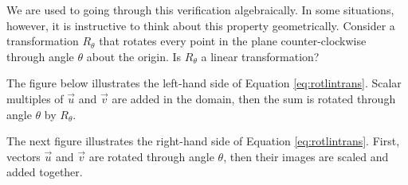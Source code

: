 \documentclass{ximera}
\begin{document}
We are used to going through this verification algebraically.  In some situations, however, it is instructive to think about this property geometrically.  Consider a transformation $R_{\theta}$ that rotates every point in the plane counter-clockwise through angle $\theta$ about the origin.  Is $R_{\theta}$ a linear transformation?

The figure below illustrates the left-hand side of Equation \ref{eq:rotlintrans}.  Scalar multiples of $\vec{u}$ and $\vec{v}$ are added in the domain, then the sum is rotated through angle $\theta$ by $R_{\theta}$.

\begin{center}
   \quad
{}
\end{center} 

The next figure  illustrates the right-hand side of Equation \ref{eq:rotlintrans}.  First, vectors $\vec{u}$ and $\vec{v}$ are rotated through angle $\theta$, then their images are scaled and added together.  


\end{document}

